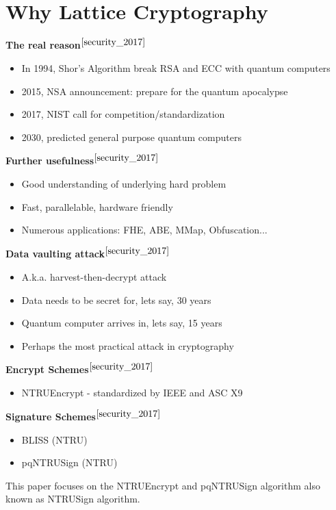 \documentclass[a4paper,12pt]{article}
\begin{document}
\section{Why Lattice Cryptography}
\begin{flushleft}
\textbf{The real reason}$^{\cite{security_2017}}$
\begin{itemize}
    \item In 1994, Shor's Algorithm break RSA and ECC with quantum computers
    \item 2015, NSA announcement: prepare for the quantum apocalypse
    \item 2017, NIST call for competition/standardization
    \item 2030, predicted general purpose quantum computers
\end{itemize}

\textbf{Further usefulness}$^{\cite{security_2017}}$
\begin{itemize}
    \item Good understanding of underlying hard problem
    \item Fast, parallelable, hardware friendly
    \item Numerous applications: FHE, ABE, MMap, Obfuscation...
\end{itemize}

\textbf{Data vaulting attack}$^{\cite{security_2017}}$
\begin{itemize}
    \item A.k.a. harvest-then-decrypt attack
    \item Data needs to be secret for, lets say, 30 years
    \item Quantum computer arrives in, lets say, 15 years
    \item Perhaps the most practical attack in cryptography
\end{itemize}

\newpage
\textbf{Encrypt Schemes}$^{\cite{security_2017}}$
\begin{itemize}
    \item NTRUEncrypt - standardized by IEEE and ASC X9
\end{itemize}

\textbf{Signature Schemes}$^{\cite{security_2017}}$
\begin{itemize}
    \item BLISS (NTRU)
    \item pqNTRUSign (NTRU)
\end{itemize}

This paper focuses on the NTRUEncrypt and pqNTRUSign algorithm also known as NTRUSign algorithm.
\end{flushleft}
\end{document}
